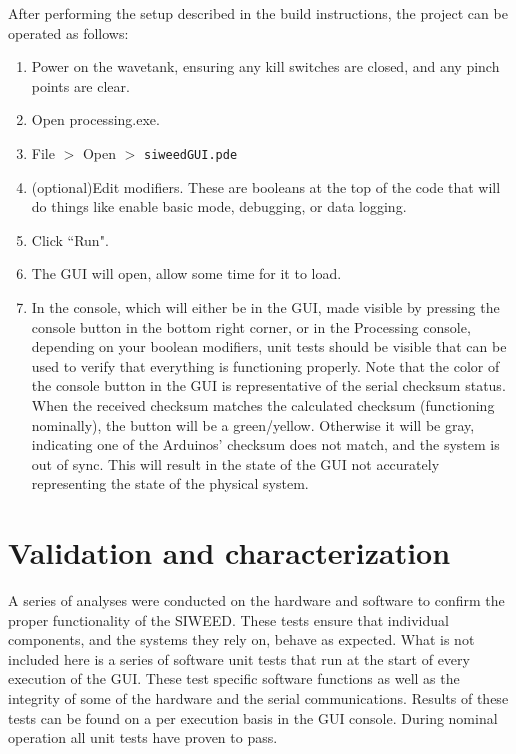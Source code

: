 \documentclass[hardware,article,submit,pdftex,moreauthors]{Definitions/mdpi}
\begin{document}
After performing the setup described in the build instructions, the project can be operated as follows:
\begin{enumerate}
\item Power on the wavetank, ensuring any kill switches are closed, and any pinch points are clear.
\item Open processing.exe.
\item File $>$ Open $>$ \texttt{siweedGUI.pde} 
\item (optional)Edit modifiers. These are booleans at the top of the code that will do things like enable basic mode, debugging, or data logging.
\item Click ``Run".
\item The GUI will open, allow some time for it to load.
\item In the console, which will either be in the GUI, made visible by pressing the console button in the bottom right corner, or in the Processing console, depending on your boolean modifiers, unit tests should be visible that can be used to verify that everything is functioning properly. 
Note that the color of the console button in the GUI is representative of the serial checksum status.
When the received checksum matches the calculated checksum (functioning nominally), the button will be a green/yellow.
Otherwise it will be gray, indicating one of the Arduinos' checksum does not match, and the system is out of sync. 
This will result in the state of the GUI not accurately representing the state of the physical system.
\end{enumerate}

\section{Validation and characterization}
A series of analyses were conducted on the hardware and software to confirm the proper functionality of the SIWEED.
These tests ensure that individual components, and the systems they rely on, behave as expected.
What is not included here is a series of software unit tests that run at the start of every execution of the GUI.
These test specific software functions as well as the integrity of some of the hardware and the serial communications. 
Results of these tests can be found on a per execution basis in the GUI console.
During nominal operation all unit tests have proven to pass.
\end{document}
